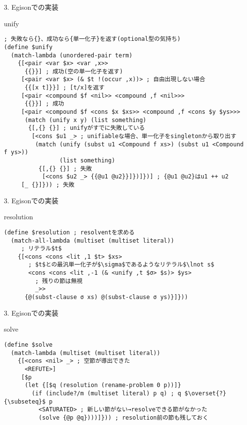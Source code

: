 \documentclass[dvipdfmx,11pt,notheorems]{beamer}
\theoremstyle{definition}
\begin{document}
\begin{frame}[fragile]{3. Egisonでの実装}
  \begin{block}{unify}
    \begin{verbatim}
; 失敗なら{}、成功なら{単一化子}を返す(optional型の気持ち)
(define $unify
  (match-lambda (unordered-pair term)
    {[<pair <var $x> <var ,x>>
      {{}}] ; 成功(空の単一化子を返す)
     [<pair <var $x> (& $t !(occur ,x))> ; 自由出現しない場合
      {{[x t]}}] ; [t/x]を返す
     [<pair <compound $f <nil>> <compound ,f <nil>>>
      {{}}] ; 成功
     [<pair <compound $f <cons $x $xs>> <compound ,f <cons $y $ys>>>
      (match (unify x y) (list something)
       {[,{} {}] ; unifyがすでに失敗している
        [<cons $u1 _> ; unifiableな場合、単一化子をsingletonから取り出す
         (match (unify (subst u1 <Compound f xs>) (subst u1 <Compound f ys>))
                (list something)
          {[,{} {}] ; 失敗
           [<cons $u2 _> {{@u1 @u2}}]})]})] ; {@u1 @u2}はu1 ++ u2
     [_ {}]})) ; 失敗
    \end{verbatim}
  \end{block}
\end{frame}

\begin{frame}[fragile]{3. Egisonでの実装}
  \begin{block}{resolution}
    \begin{verbatim}
(define $resolution ; resolventを求める
  (match-all-lambda (multiset (multiset literal))
     ; リテラル$t$
    {[<cons <cons <lit ,1 $t> $xs>
       ; $t$との最汎単一化子が$\sigma$であるようなリテラル$\lnot s$
       <cons <cons <lit ,-1 (& <unify ,t $σ> $s)> $ys>
         ; 残りの節は無視
         _>>
      {@(subst-clause σ xs) @(subst-clause σ ys)}]}))
    \end{verbatim}
  \end{block}
\end{frame}

\begin{frame}[fragile]{3. Egisonでの実装}
  \begin{block}{solve}
    \begin{verbatim}
(define $solve
  (match-lambda (multiset (multiset literal))
    {[<cons <nil> _> ; 空節が導出できた
      <REFUTE>]
     [$p
      (let {[$q (resolution (rename-problem 0 p))]}
        (if (include?/m (multiset literal) p q) ; q $\overset{?}{\subseteq}$ p
          <SATURATED> ; 新しい節がない→resolveできる節がなかった
          (solve {@p @q})))]})) ; resolution前の節も残しておく
    \end{verbatim}
  \end{block}
\end{frame}
\end{document}

